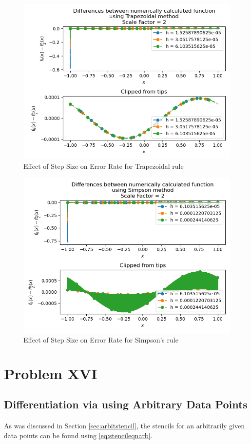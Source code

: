 \documentclass[letterpaper,12pt]{article}
\begin{document}
\begin{figure}[H]
\centerline{\includegraphics[width=0.7\linewidth]{figures/15-5-0.png}}
\caption{Effect of Step Size on Error Rate for Trapezoidal rule}
\label{fig:15-5-0}
\end{figure}

\begin{figure}[H]
\centerline{\includegraphics[width=0.7\linewidth]{figures/15-5-1.png}}
\caption{Effect of Step Size on Error Rate for Simpson's rule}
\label{fig:15-5-1}
\end{figure}

\pagebreak

\section{Problem XVI}
\subsection{Differentiation via using Arbitrary Data Points}
\paragraph{}As was discussed in Section \ref{sec:arbitstencil}, the stencils for an arbitrarily given data points can be found using \eqref{eq:stencileqnarb}.
\end{document}
